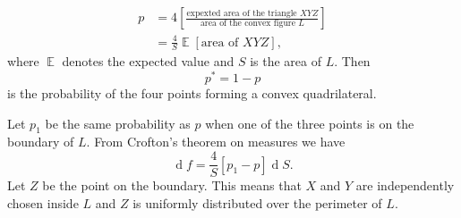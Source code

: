 \documentclass{article}
\DeclareMathOperator{\dif}{d}
\DeclareMathOperator{\E}{\mathbb{E}}
\begin{document}
\begin{equation}
    \begin{aligned}
        p &= 4\left[\frac{\text{expexted area of the triangle }XYZ}{\text{area of the convex figure } L}\right] 
        \\
        &= \frac{4}{S}\E[\text{area of } XYZ],
    \end{aligned}
\end{equation}
where $\E$ denotes the expected value and $S$ is the area of $L$.
Then
\begin{equation}
    p^{*} = 1 - p
\end{equation}
is the probability of the four points forming a convex quadrilateral.

Let $p_{1}$ be the same probability as $p$ when one of the three points is on the boundary of $L$.
From Crofton's theorem on measures \cite{geom} we have
\begin{equation}
    \dif f = \frac{4}{S}[p_{1} - p]\dif S.
\end{equation}
Let $Z$ be the point on the boundary.
This means that $X$ and $Y$ are independently chosen inside $L$ and $Z$ is uniformly distributed over the perimeter of $L$.
\end{document}
